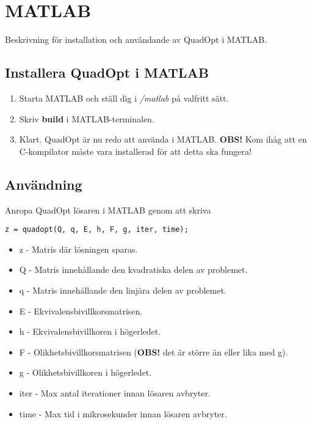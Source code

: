 \section{MATLAB}
Beskrivning för installation och användande av QuadOpt i MATLAB.

\subsection{Installera QuadOpt i MATLAB}
\begin{enumerate}
	\item Starta MATLAB och ställ dig i \emph{/matlab} på valfritt sätt. 
	\item Skriv \textbf{build} i MATLAB-terminalen.
	\item Klart. QuadOpt är nu redo att använda i MATLAB.
	\newline
	\newline
	\textbf{OBS!} Kom ihåg att en C-kompilator måste vara installerad för att detta ska fungera!
\end{enumerate}

\subsection{Användning}
Anropa QuadOpt lösaren i MATLAB genom att skriva

\begin{lstlisting}
z = quadopt(Q, q, E, h, F, g, iter, time);
\end{lstlisting}

\begin{itemize}
	\item z - Matris där lösningen sparas.
	\item Q - Matris innehållande den kvadratiska delen av problemet.
	\item q - Matris innehållande den linjära delen av problemet.
	\item E - Ekvivalensbivillkorsmatrisen.
	\item h - Ekvivalensbivillkoren i högerledet.
	\item F - Olikhetsbivillkorsmatrisen (\textbf{OBS!} det är större än eller lika med g).
	\item g - Olikhetsbivillkoren i högerledet.
	\item iter - Max antal iterationer innan lösaren avbryter.
	\item time - Max tid i mikrosekunder innan lösaren avbryter.
\end{itemize}
